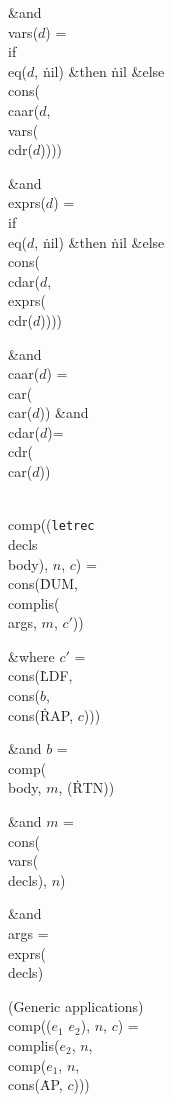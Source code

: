 \&{and} \\{vars}($d$) = \\{if} \\{eq}($d$, \.{nil}) \&{then} \.{nil}
\&{else} \\{cons}(\\{caar}($d$, \\{vars}(\\{cdr}($d$))))

\&{and} \\{exprs}($d$) = \\{if} \\{eq}($d$, \.{nil}) \&{then} \.{nil}
\&{else} \\{cons}(\\{cdar}($d$, \\{exprs}(\\{cdr}($d$))))

\&{and} \\{caar}($d$) = \\{car}(\\{car}($d$)) \&{and} \\{cdar}($d$)=\\{cdr}(%
\\{car}($d$))

\bull \\{comp}(({\tt letrec}~\\{decls}~\\{body}), $n$, $c$)
= \\{cons}(\.{DUM}, \\{complis}(\\{args}, $m$, $c'$))

\&{where} $c'$ = \\{cons}(\.{LDF}, \\{cons}($b$, \\{cons}(\.{RAP}, $c$)))

\&{and} $b$ = \\{comp}(\\{body}, $m$, (\.{RTN}))

\&{and} $m$ = \\{cons}(\\{vars}(\\{decls}), $n$)

\&{and} \\{args} = \\{exprs}(\\{decls})

\bull (Generic applications)
\\{comp}(($e_{1}$ $e_{2}$), $n$, $c$) =
\\{complis}($e_{2}$, $n$, \\{comp}($e_{1}$, $n$, \\{cons}(\.{AP}, $c$)))

